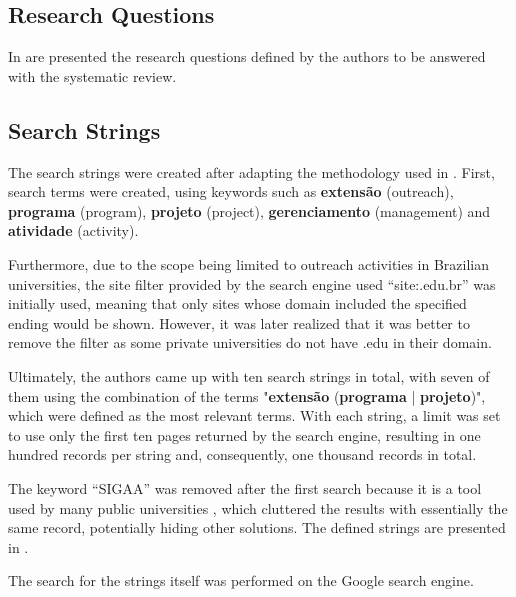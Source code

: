 

\subsection{Research Questions}\label{sec:gl-planning-rq}

In  are presented the research questions defined by the authors to be answered with the systematic review.



\subsection{Search Strings}\label{sec:gl-planning-strings}

The search strings were created after adapting the methodology used in \cite{godin2015applying}. First, search terms were created, using keywords such as \textbf{extensão} (outreach), \textbf{programa} (program), \textbf{projeto} (project), \textbf{gerenciamento} (management) and \textbf{atividade} (activity).

Furthermore, due to the scope being limited to outreach activities in Brazilian universities, the site filter provided by the search engine used ``site:.edu.br'' was initially used, meaning that only sites whose domain included the specified ending would be shown. However, it was later realized that it was better to remove the filter as some private universities do not have .edu in their domain.

Ultimately, the authors came up with ten search strings in total, with seven of them using the combination of the terms "\textbf{extensão} (\textbf{programa} | \textbf{projeto})", which were defined as the most relevant terms. With each string, a limit was set to use only the first ten pages returned by the search engine, resulting in one hundred records per string and, consequently, one thousand records in total.

The keyword ``\acs{SIGAA}'' was removed after the first search because it is a tool used by many public universities \cite{das2013sistema}, which cluttered the results with essentially the same record, potentially hiding other solutions. The defined strings are presented in .



The search for the strings itself was performed on the Google search engine.

